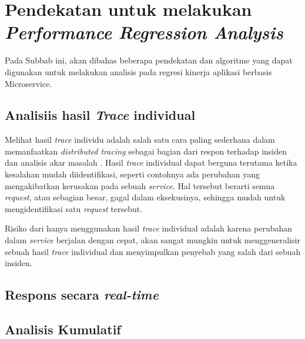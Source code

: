 \section{Pendekatan untuk melakukan \textit{Performance Regression Analysis}}
Pada Subbab ini, akan dibahas beberapa pendekatan dan algoritme yang dapat digunakan untuk melakukan analisis pada regresi kinerja aplikasi berbasis Microservice.
\label{ch2-algo}


\subsection{Analisiis hasil \textit{Trace} individual}
Melihat hasil \textit{trace} individu adalah salah satu cara paling sederhana dalam memanfaatkan \textit{distributed tracing} sebagai bagian dari respon terhadap insiden dan analisis akar masalah \citep{parker2020distributed}. Hasil \textit{trace} individual dapat berguna terutama ketika kesalahan mudah diidentifikasi, seperti contohnya ada perubahan yang mengakibatkan kerusakan pada sebuah \textit{service}. Hal tersebut berarti semua \textit{request}, atau sebagian besar, gagal dalam eksekusinya, sehingga mudah untuk mengidentifikasi satu \textit{request} tersebut.

Risiko dari hanya menggunakan hasil \textit{trace} individual adalah karena perubahan dalam \textit{service} berjalan dengan cepat, akan sangat mungkin untuk menggeneralisir sebuah hasil \textit{trace} individual dan menyimpulkan penyebab yang salah dari sebuah insiden. 




\subsection{Respons secara \textit{real-time}}
\label{approach-realtime}


\subsection{Analisis Kumulatif}
\label{approach-cumulative}





